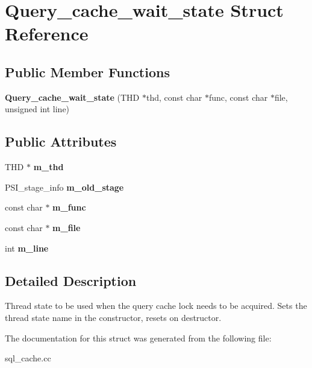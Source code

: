 \hypertarget{structQuery__cache__wait__state}{}\section{Query\+\_\+cache\+\_\+wait\+\_\+state Struct Reference}
\label{structQuery__cache__wait__state}
\subsection*{Public Member Functions}
\begin{DoxyCompactItemize}
\item 
\mbox{\label{structQuery__cache__wait__state_ad7883ecbf0b70d43cb5d5770e44bcf8d}} 
{\bfseries Query\+\_\+cache\+\_\+wait\+\_\+state} (T\+HD $\ast$thd, const char $\ast$func, const char $\ast$file, unsigned int line)
\end{DoxyCompactItemize}
\subsection*{Public Attributes}
\begin{DoxyCompactItemize}
\item 
\mbox{\label{structQuery__cache__wait__state_a92f26873bfad6398caa19086988453b3}} 
T\+HD $\ast$ {\bfseries m\+\_\+thd}
\item 
\mbox{\label{structQuery__cache__wait__state_ab7bc6cf49476f3cf89210c7eb1650249}} 
P\+S\+I\+\_\+stage\+\_\+info {\bfseries m\+\_\+old\+\_\+stage}
\item 
\mbox{\label{structQuery__cache__wait__state_a2656930dc8d818b8c0d5ea6e646dfc88}} 
const char $\ast$ {\bfseries m\+\_\+func}
\item 
\mbox{\label{structQuery__cache__wait__state_a8d80031bfb51750cd23696b8ffd058cc}} 
const char $\ast$ {\bfseries m\+\_\+file}
\item 
\mbox{\label{structQuery__cache__wait__state_adff2613c99babddf93620127eea4ae6a}} 
int {\bfseries m\+\_\+line}
\end{DoxyCompactItemize}


\subsection{Detailed Description}
Thread state to be used when the query cache lock needs to be acquired. Sets the thread state name in the constructor, resets on destructor. 

The documentation for this struct was generated from the following file\+:\begin{DoxyCompactItemize}
\item 
sql\+\_\+cache.\+cc\end{DoxyCompactItemize}
